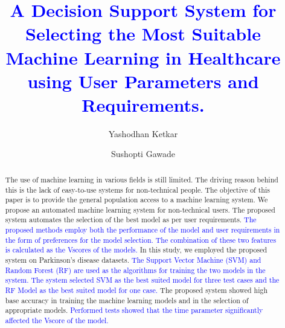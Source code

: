\documentclass[a4paper,fleqn]{cas-dc}
\newcommand{\responsemodsm}[1]{\textcolor{blue}{#1}}
\begin{document}
\let\WriteBookmarks\relax
\def\floatpagepagefraction{1}
\def\textpagefraction{.001}



\title [mode = title]{\responsemodsm{A Decision Support System for Selecting the Most Suitable Machine Learning in Healthcare using User Parameters and Requirements.}}

\let\printorcid\relax

\author[1]{Yashodhan Ketkar}

\author[2]{Sushopti Gawade}

\begin{abstract}
    The use of machine learning in various fields is still limited. The driving reason behind this is the lack of easy-to-use systems for non-technical people. The objective of this paper is to provide the general population access to a machine learning system. We propose an automated machine learning system for non-technical users. The proposed system automates the selection of the best model as per user requirements. \responsemodsm{The proposed methods employ both the performance of the model and user requirements in the form of preferences for the model selection. The combination of these two features is calculated as the Vscores of the models.} In this study, we employed the proposed system on Parkinson's disease datasets. \responsemodsm{The Support Vector Machine (SVM) and Random Forest (RF) are used as the algorithms for training the two models in the system. The system selected SVM as the best suited model for three test cases and the RF Model as the best suited model for one case.} The proposed system showed high base accuracy in training the machine learning models and in the selection of appropriate models. \responsemodsm{Performed tests showed that the time parameter significantly affected the Vscore of the model.}
\end{abstract}
\end{document}
